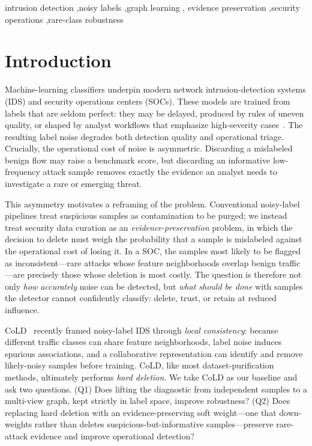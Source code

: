 \documentclass[preprint,3p,times]{elsarticle}
\begin{document}
\begin{frontmatter}
\begin{keyword}
intrusion detection \sep noisy labels \sep graph learning \sep
evidence preservation \sep security operations \sep rare-class robustness
\end{keyword}

\end{frontmatter}

\section{Introduction}
\label{sec:intro}
Machine-learning classifiers underpin modern network intrusion-detection systems
(IDS) and security operations centers (SOCs). These models are trained from labels
that are seldom perfect: they may be delayed, produced by rules of uneven quality,
or shaped by analyst workflows that emphasize high-severity cases~\cite{arp2022dodont,song2022survey}.
The resulting label noise degrades both detection quality and operational triage.
Crucially, the operational cost of noise is asymmetric. Discarding a mislabeled
benign flow may raise a benchmark score, but discarding an informative
low-frequency attack sample removes exactly the evidence an analyst needs to
investigate a rare or emerging threat.

This asymmetry motivates a reframing of the problem. Conventional noisy-label
pipelines treat suspicious samples as contamination to be purged; we instead
treat security data curation as an \emph{evidence-preservation} problem, in
which the decision to delete must weigh the probability that a sample is
mislabeled against the operational cost of losing it. In a SOC, the samples
most likely to be flagged as inconsistent---rare attacks whose feature
neighborhoods overlap benign traffic---are precisely those whose deletion is
most costly. The question is therefore not only \emph{how accurately} noise can
be detected, but \emph{what should be done} with samples the detector cannot
confidently classify: delete, trust, or retain at reduced influence.

CoLD~\cite{yang2026cold} recently framed noisy-label IDS through \emph{local
consistency}: because different traffic classes can share feature neighborhoods,
label noise induces spurious associations, and a collaborative representation can
identify and remove likely-noisy samples before training. CoLD, like most
dataset-purification methods, ultimately performs \emph{hard deletion}. We take
CoLD as our baseline and ask two questions. (Q1) Does lifting the diagnostic from
independent samples to a multi-view graph, kept strictly in label space, improve
robustness? (Q2) Does replacing hard deletion with an evidence-preserving soft
weight—one that down-weights rather than deletes suspicious-but-informative
samples—preserve rare-attack evidence and improve operational detection?
\end{document}

